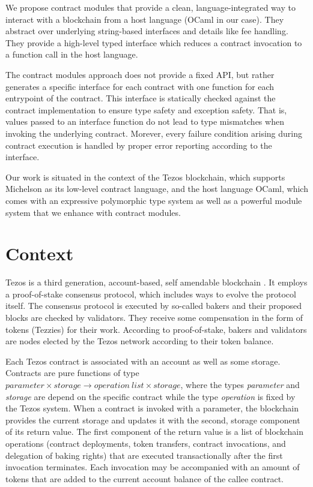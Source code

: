 \documentclass[a4paper,USenglish,american,cleveref, autoref, thm-restate]{oasics-v2021}
\begin{document}
We propose contract modules that provide a clean, language-integrated
way to interact with a blockchain from a host language (OCaml in our
case). They abstract over underlying string-based interfaces and
details like fee handling. They provide a high-level typed interface
which reduces a contract invocation to a function call in the host
language.

The contract modules approach does not provide a fixed API, but
rather generates a specific interface for each contract with one
function for each entrypoint of the contract. This
interface is statically checked against the contract implementation to
ensure type safety and exception safety. That is, values passed to an
interface function do not lead to type mismatches when invoking the
underlying contract. Morever, every failure condition arising during
contract execution is handled by proper error reporting according to
the interface.

Our work is situated in the context of the Tezos blockchain, which
supports Michelson as its low-level contract language, and the
host language OCaml, which comes with an expressive polymorphic type system
as well as a powerful module system that we
enhance with contract modules. 

\section{Context}
\label{sec:context}

Tezos is a third generation, account-based, self amendable
blockchain \cite{tezos-whitepaper}. It employs a proof-of-stake consensus protocol, which
includes ways to evolve the protocol itself. The consensus protocol is
executed by so-called bakers and their proposed blocks are checked by
validators. They receive some compensation in the form of
tokens (Tezzies) for their work. According to proof-of-stake,
bakers and validators are nodes elected by the Tezos network
according to their token balance. 

Each Tezos contract is associated with an account as well as some
storage. Contracts are pure functions of type $\mathit{parameter} \times
\mathit{storage} \to \mathit{operation\ list} \times
\mathit{storage}$, where the types \textit{parameter} and
\textit{storage} are depend on the specific contract while the type
\textit{operation} is fixed by the Tezos system. When a contract is invoked with a parameter,
the blockchain provides the current storage and updates it with the
second, storage component of its return value. The first component of
the return value is a list of blockchain operations (contract deployments, token
transfers, contract invocations, and delegation of baking rights) that
are executed transactionally after the first invocation terminates. Each invocation may be
accompanied with an amount of tokens that are added to the current
account balance of the callee contract.
\end{document}
